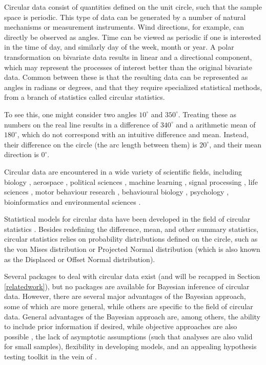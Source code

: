 \documentclass{article}
\begin{document}
Circular data consist of quantities defined on the unit circle, such
that the sample space is periodic. This type of data can be generated by
a number of natural mechanisms or measurement instruments. Wind
directions, for example, can directly be observed as angles. Time can be
viewed as periodic if one is interested in the time of day, and
similarly day of the week, month or year. A polar transformation on
bivariate data results in linear and a directional component, which may
represent the processes of interest better than the original bivariate
data. Common between these is that the resulting data can be represented
as angles in radians or degrees, and that they require specialized
statistical methods, from a branch of statistics called circular
statistics.

To see this, one might consider two angles \(10^\circ\) and
\(350^\circ.\) Treating these as numbers on the real line results in a
difference of \(340^\circ\) and a arithmetic mean of \(180^\circ\),
which do not correspond with an intuitive difference and mean. Instead,
their difference on the circle (the arc length between them) is
\(20^\circ\), and their mean direction is \(0^\circ\).

Circular data are encountered in a wide variety of scientific fields,
including biology \citep{nunez2018bayesian}, aerospace
\citep{kurz2017deterministic}, political sciences \citep{gill2010},
machine learning \citep{gopal2014mises}, signal processing
\citep{traa2013wrapped}, life sciences \citep{mardianew}, motor
behaviour research
\citep{mechsner2001perceptual, mechsner2007bimanual, postma2008keep, baayen2012test},
behavioural biology \citep{bulbert2015danger}, psychology
\citep{Leary1957, gurtman2003circumplex, kaas2006haptic,  gurtman2009exploring},
bioinformatics \citep{mardia2008multivariate} and environmental sciences
\citep{lagona2016regression, lagona2015hidden, arnold2006recent}.

Statistical models for circular data have been developed in the field of
circular statistics
\citep{fisher1995statistical, jammalamadaka2001topics, mardia2009directional, pewsey2013circular, ley2017modern, ley2018applied}.
Besides redefining the difference, mean, and other summary statistics,
circular statistics relies on probability distributions defined on the
circle, such as the von Mises distribution \citep{von1918ganzzahligkeit}
or Projected Normal distribution \citep{Kendall1974} (which is also
known as the Displaced or Offset Normal distribution).

Several packages to deal with circular data exist (and will be recapped
in Section \ref{relatedwork}), but no packages are available for
Bayesian inference of circular data. However, there are several major
advantages of the Bayesian approach, some of which are more general,
while others are specific to the field of circular data. General
advantages of the Bayesian approach are, among others, the ability to
include prior information if desired, while objective approaches are
also possible \citep{berger2006case}, the lack of asymptotic assumptions
(such that analyses are also valid for small samples), flexibility in
developing models, and an appealing hypothesis testing toolkit in the
vein of \citet{jeffreys1961theory}.
\end{document}
